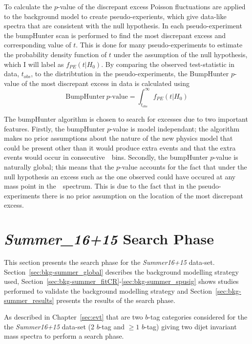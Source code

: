 To calculate the $p$-value of the discrepant excess
Poisson fluctuations are applied to the background model to create pseudo-experients,
which give data-like spectra that are consistent with the null hypothesis.
In each pseudo-experiment the bumpHunter scan is performed to find the most discrepant excess and corresponding value of $t$.
This is done for many pseudo-experiments to estimate the probability density function of $t$ under the assumption of the null hypothesis,
which I will label as $f_{PE}(t| H_0)$.
By comparing the observed test-statistic in data, $t_{obs}$,
to the distribtution in the pseudo-experiments,
the BumpHunter $p$-value of the most discrepant excess in data is calculated using
\begin{equation}
  \text{BumpHunter}~p\text{-value} = \int_{t_{obs}}^\infty f_{PE}(t | H_0)
\end{equation}

The bumpHunter algorithm is chosen to search for excesses due to two important features.
Firstly, the bumpHunter $p$-value is model independant;
the algorithm makes no prior assumptions about the nature of the new physics model that could be present
other than it would produce extra events and that the extra events would occur in consecutive~\mjj~bins.
Secondly, the bumpHunter $p$-value is naturally global;
this means that the $p$-value accounts for the fact that under the null hypothesis an excess such as the one observed could have occured at any mass point in the~\mjj~spectrum.
This is due to the fact that in the pseudo-experiments there is no prior assumption on the location of the most discrepant excess.

\section{\textit{Summer\_16+15} Search Phase}
\label{sec:bkg-summer}

This section presents the search phase for the \textit{Summer16+15} data-set.
Section~\ref{sec:bkg-summer_global} describes the background modelling strategy used,
Section~\ref{sec:bkg-summer_fitCR}-\ref{sec:bkg-summer_spusig}
shows studies performed to validate the background modelling strategy
and Section~\ref{sec:bkg-summer_results} presents the results of the search phase.

As described in Chapter~\ref{sec:evt}
that are two $b$-tag categories considered for the the \textit{Summer16+15} data-set 
(2 $b$-tag and $\geq1$ $b$-tag)
giving two dijet invariant mass spectra to perform a search phase.

